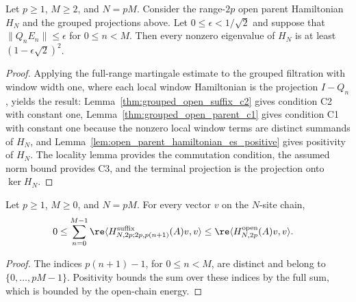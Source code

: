 \begin{lemma}
    \label{thm:grouped_open_parent_gap}
    \leanok
    Let $p\geq1$, $M\geq2$, and $N=pM$. Consider the
    range-$2p$ open parent Hamiltonian $H_N$ and the grouped
    projections above. Let $0\leq\epsilon<1/\sqrt2$ and suppose that
    $\|Q_nE_n\|\leq\epsilon$ for $0\leq n<M$. Then every nonzero
    eigenvalue of $H_N$ is at least $(1-\epsilon\sqrt2)^2$.
\end{lemma}
\begin{proof}
    \leanok
    Applying the full-range martingale estimate to the grouped filtration with
    window width one, where each local window Hamiltonian is the projection
    $I-Q_n$, yields the result: Lemma~\ref{thm:grouped_open_suffix_c2} gives
    condition C2 with constant one, Lemma~\ref{thm:grouped_open_parent_c1}
    gives condition C1 with constant one because the nonzero local window terms
    are distinct summands of $H_N$, and
    Lemma~\ref{lem:open_parent_hamiltonian_es_positive} gives positivity of
    $H_N$. The locality lemma provides the commutation condition, the assumed
    norm bound provides C3, and the terminal projection is the projection onto
    $\ker H_N$.
\end{proof}

\begin{lemma}
    \label{thm:grouped_open_parent_c1}
    \leanok
    Let $p\geq1$, $M\geq0$, and $N=pM$. For every vector $v$ on the
    $N$-site chain,
    \begin{align}
        0 & \leq \sum_{n=0}^{M-1}
        \re\langle H^{\mathrm{suffix}}_{N,2p;2p,p(n+1)}(A)v,v\rangle
        \leq \re\langle H^{\mathrm{open}}_{N,2p}(A)v,v\rangle.
    \end{align}
\end{lemma}
\begin{proof}
    \leanok
    The indices $p(n+1)-1$, for $0\leq n<M$, are distinct and belong to
    $\{0,\ldots,pM-1\}$. Positivity bounds the sum over these indices by
    the full sum, which is bounded by the open-chain energy.
\end{proof}


